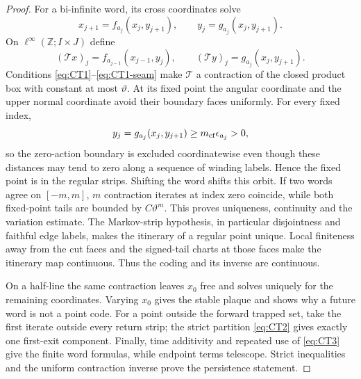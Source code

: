 \documentclass[11pt]{amsart}
\numberwithin{equation}{section}
\theoremstyle{definition}
\theoremstyle{remark}
\begin{document}
\begin{proof}
For a bi-infinite word, its cross coordinates solve
\begin{equation}\label{eq:sequence-cross}
 x_{j+1}=f_{a_j}(x_j,y_{j+1}),\qquad
 y_j=g_{a_j}(x_j,y_{j+1}).
\end{equation}
On $\ell^\infty(\mathbb Z;I\times J)$ define
\begin{equation}\label{eq:sequence-contraction}
 (\mathcal T x)_j=f_{a_{j-1}}(x_{j-1},y_j),\qquad
 (\mathcal T y)_j=g_{a_j}(x_j,y_{j+1}).
\end{equation}
Conditions \eqref{eq:CT1}--\eqref{eq:CT1-seam} make $\mathcal T$ a
contraction of the closed product box with constant at most $\vartheta$.
At its fixed point the angular coordinate and the upper normal coordinate
avoid their boundary faces uniformly.  For every fixed index,
\begin{equation}\label{eq:fixed-point-seam-exclusion}
 y_j=g_{a_j}(x_j,y_{j+1})\ge m_{\rm cf}\epsilon_{a_j}>0,
\end{equation}
so the zero-action boundary is excluded coordinatewise even though these
distances may
tend to zero along a sequence of winding labels.  Hence the fixed point is
in the regular strips.  Shifting the word shifts this orbit.  If two words agree
on $[-m,m]$, $m$ contraction iterates at index zero coincide, while both
fixed-point tails are bounded by $C\vartheta^m$.  This proves uniqueness,
continuity and the variation estimate.  The Markov-strip hypothesis, in
particular disjointness and faithful edge labels, makes the itinerary of a
regular point unique.  Local finiteness away from the cut faces and the
signed-tail charts at those faces make the itinerary map continuous.  Thus
the coding and its inverse are continuous.

On a half-line the same contraction leaves $x_0$ free and solves uniquely
for the remaining coordinates.  Varying $x_0$ gives the stable plaque and
shows why a future word is not a point code.  For a point outside the
forward trapped set, take the first iterate outside every return strip;
the strict partition \eqref{eq:CT2} gives exactly one first-exit component.
Finally, time additivity and repeated use of \eqref{eq:CT3} give the finite
word formulas, while endpoint terms telescope.  Strict inequalities and
the uniform contraction inverse prove the persistence statement.
\end{proof}
\end{document}
